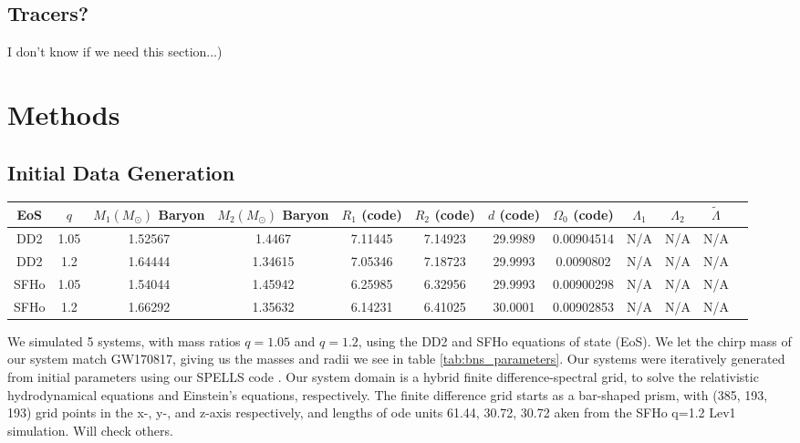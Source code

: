 \documentclass[%
twocolumn,
superscriptaddress,
nofootinbib,
 amsmath,amssymb,
 aps, prd
]{revtex4-2}
\newcommand{\alex}[1]{\color{red}{#1}}
\begin{document}
  \subsection{Tracers?}
    {\alex (I don't know if we need this section...)}

\section{Methods}
  \subsection{Initial Data Generation}
\begin{table*}[t]
  \centering
  \begin{tabular}{||c||c|c||c|c|c|c|c|c|c|c|c||}
    \hline
    EoS & $q$ & $M_1 (M_\odot)$ Baryon & $M_2 (M_\odot)$ Baryon& $R_1$ (code) & $R_2$ (code) & $d$ (code) & $\Omega_0$ (code) & $\Lambda_1$ & $\Lambda_2$ & $\tilde{\Lambda}$\\
    \hline \hline
    DD2 & 1.05 & 1.52567 & 1.4467 & 7.11445 & 7.14923 & 29.9989 & 0.00904514 & N/A & N/A & N/A\\
    \hline
    DD2 & 1.2 & 1.64444& 1.34615 & 7.05346 & 7.18723 & 29.9993 & 0.0090802 & N/A & N/A & N/A\\
    \hline
    \hline
    SFHo & 1.05 & 1.54044 & 1.45942 & 6.25985 & 6.32956 & 29.9993  & 0.00900298 & N/A & N/A & N/A\\
    \hline
    SFHo & 1.2 & 1.66292 & 1.35632 & 6.14231 & 6.41025 & 30.0001 & 0.00902853 & N/A & N/A & N/A \\
    \hline
  \end{tabular}

  \caption{
    {\alex Numbers are still in code units (baryonic mass too), but I will shift them over soon. I just wanted them all in once place before I did all the calculations. And I need to do the $\Lambda$ calculations.}
}
  \label{tab:bns_parameters}
\end{table*}

  We simulated 5 systems, with mass ratios $q=1.05$ and $q=1.2$, using the DD2 \cite{Hempel_2012} and SFHo \cite{Steiner_2013} equations of state (EoS).
  We let the chirp mass of our system match GW170817, giving us the masses and radii we see in table \ref{tab:bns_parameters}.
  Our systems were iteratively generated from initial parameters using our SPELLS code \cite{Pfeiffer_2003}.
  Our system domain is a hybrid finite difference-spectral grid, to solve the relativistic hydrodynamical equations and Einstein's equations, respectively.
  The finite difference grid starts as a bar-shaped prism, with (385, 193, 193) grid points in the x-, y-, and z-axis respectively, and lengths of {\alex code units} 61.44, 30.72, 30.72 {\alex taken from the SFHo q=1.2 Lev1 simulation. Will check others}.
  
\end{document}
